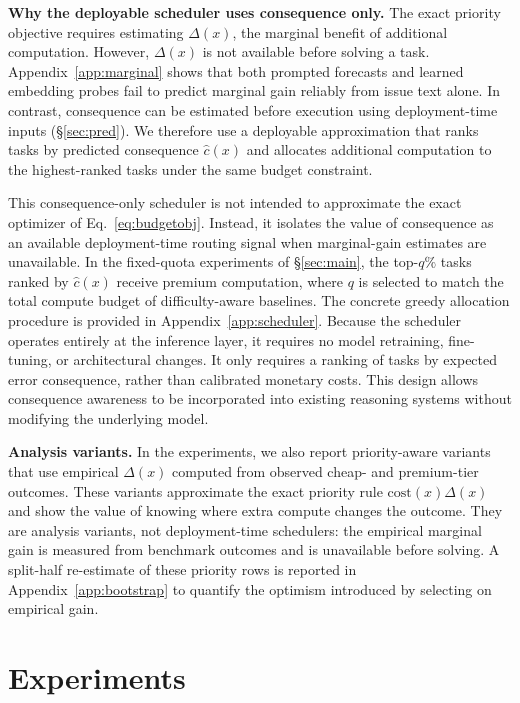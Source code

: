 \documentclass{article}
\begin{document}
\textbf{Why the deployable scheduler uses consequence only.}
The exact priority objective requires estimating $\Delta(x)$, the
marginal benefit of additional computation. However, $\Delta(x)$ is
not available before solving a task. Appendix~\ref{app:marginal} shows
that both prompted forecasts and learned embedding probes fail to
predict marginal gain reliably from issue text alone. In contrast,
consequence can be estimated before execution using deployment-time
inputs (\S\ref{sec:pred}). We therefore use a deployable approximation
that ranks tasks by predicted consequence $\hat{c}(x)$ and allocates
additional computation to the highest-ranked tasks under the same
budget constraint.

This consequence-only scheduler is not intended to approximate the
exact optimizer of Eq.~\ref{eq:budgetobj}. Instead, it isolates the
value of consequence as an available deployment-time routing signal
when marginal-gain estimates are unavailable. In the fixed-quota
experiments of \S\ref{sec:main}, the top-$q\%$ tasks ranked by
$\hat{c}(x)$ receive premium computation, where $q$ is selected to match
the total compute budget of difficulty-aware baselines. The concrete
greedy allocation procedure is provided in
Appendix~\ref{app:scheduler}.
Because the scheduler operates entirely at the inference layer, it
requires no model retraining, fine-tuning, or architectural changes.
It only requires a ranking of tasks by expected error consequence,
rather than calibrated monetary costs. This design allows consequence
awareness to be incorporated into existing reasoning systems without
modifying the underlying model.

\textbf{Analysis variants.}
In the experiments, we also report priority-aware variants that use
empirical $\Delta(x)$ computed from observed cheap- and premium-tier
outcomes. These variants approximate the exact priority rule
$\mathrm{cost}(x)\Delta(x)$ and show the value of knowing where extra
compute changes the outcome. They are analysis variants, not
deployment-time schedulers: the empirical marginal gain is measured
from benchmark outcomes and is unavailable before solving. A split-half
re-estimate of these priority rows is reported in
Appendix~\ref{app:bootstrap} to quantify the optimism introduced by
selecting on empirical gain.


\section{Experiments}
\end{document}
